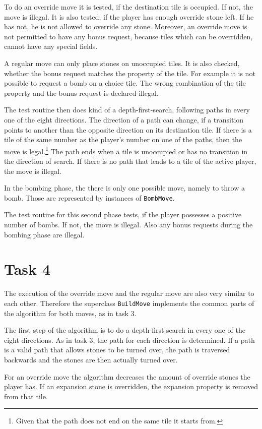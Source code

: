 To do an override move it is tested, if the destination tile is occupied. If not, the move is illegal. It is also tested, if the player has enough override stone left. If he has not, he is not allowed to override any stone. Moreover, an override move is not permitted to have any bonus request, because tiles which can be overridden, cannot have any special fields.

A regular move can only place stones on unoccupied tiles. It is also checked, whether the bonus request matches the property of the tile. For example it is not possible to request a bomb on a choice tile. The wrong combination of the tile property and the bonus request is declared illegal.

The test routine then does kind of a depth-first-search, following paths in every one of the eight directions. The direction of a path can change, if a transition points to another than the opposite direction on its destination tile. If there is a tile of the same number as the player's number on one of the paths, then the move is legal.\footnote{Given that the path does not end on the same tile it starts from.} The path ends when a tile is unoccupied or has no transition in the direction of search. If there is no path that leads to a tile of the active player, the move is illegal.

In the bombing phase, the  there is only one possible move, namely to throw a bomb. Those are represented by instances of \texttt{BombMove}.

The test routine for this second phase tests, if the player possesses a positive number of bombs. If not, the move is illegal. Also any bonus requests during the bombing phase are illegal. 

\section{Task 4}
The execution of the override move and the regular move are also very similar to each other. Therefore the superclass \texttt{BuildMove} implements the common parts of the algorithm for both moves, as in task 3.

The first step of the algorithm is to do a depth-first search in every one of the eight directions. As in task 3, the path for each direction is determined. If a path is a valid path that allows stones to be turned over, the path is traversed backwards and the stones are then actually turned over.

For an override move the algorithm decreases the amount of override stones the player has. If an expansion stone is overridden, the expansion property is removed from that tile.

